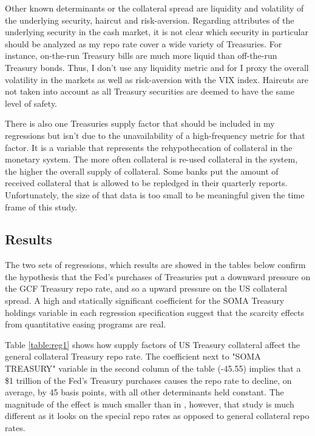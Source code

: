 \documentclass[11pt,a4paper,english,oneside]{article}
\begin{document}
Other known determinants or the collateral spread are liquidity and volatility of the underlying security, haircut and risk-aversion. Regarding attributes of the underlying security in the cash market, it is not clear which security in particular should be analyzed as my repo rate cover a wide variety of Treasuries. For instance, on-the-run Treasury bills are much more liquid than off-the-run Treasury bonds. Thus, I don't use any liquidity metric and for I proxy the overall volatility in the markets as well as risk-aversion with the VIX index. Haircuts are not taken into account as all Treasury securities are deemed to have the same level of safety.

There is also one Treasuries supply factor that should be included in my regressions but isn't due to the unavailability of a high-frequency metric for that factor. It is a variable that represents the rehypothecation of collateral in the monetary system. The more often collateral is re-used collateral in the system, the higher the overall supply of collateral. Some banks put the amount of received  collateral that is allowed to be repledged in their quarterly reports. Unfortunately, the size of that data is too small to be meaningful given the time frame of this study.

\newpage %

\subsection{Results} %

The two sets of regressions, which results are showed in the tables below confirm the hypothesis that the Fed's purchases of Treasuries put a downward pressure on the GCF Treasury repo rate, and so a upward pressure on the US collateral spread. A high and statically significant coefficient for the SOMA Treasury holdings variable in each regression specification suggest that the scarcity effects from quantitative easing programs are real.

Table \ref{table:reg1} shows how supply factors of US Treasury collateral affect the general collateral Treasury repo rate. The coefficient next to "SOMA TREASURY" variable in the second column of the table (-45.55) implies that a \$1 trillion of the Fed's Treasury purchases causes the repo rate to decline, on average, by 45 basis points, with all other determinants held constant. The magnitude of the effect is much smaller than in \citet{damico2014}, however, that study is much different as it looks on the special repo rates as opposed to general collateral repo rates.
\end{document}

